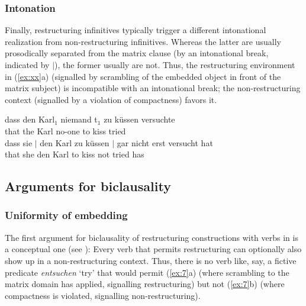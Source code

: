 \documentclass[output=paper]{langsci/langscibook}
\begin{document}
\subsubsection{\label{m7}Intonation}

Finally, restructuring infinitives typically trigger a different intonational
realization from non-restructuring infinitives. Whereas the latter are usually
prosodically separated from the matrix clause (by an intonational break,
indicated by $|$), the former usually are not. Thus, the restructuring
environment in (\ref{ex:xx}a) (signalled by scrambling of the embedded object
in front of the matrix subject) is incompatible with an intonational break; the
non-restructuring context (signalled by a violation of compactness) favors it.

\ea\label{ex:xx} 
    \ea \gll dass den Karl$_1$  niemand t$_1$ zu küssen versuchte\\
    that the Karl\textsubscript{\Acc} no-one\textsubscript{\Nom} {}  to kiss tried\\
    \ex \gll dass sie $|$ den Karl zu küssen $|$  gar nicht erst versucht hat\\
    that she\textsubscript{\Nom} {} den Karl\textsubscript{\Acc} to kiss {} \Ptcl{} not \Ptcl{} tried has\\
    \z
\z

\subsection{Arguments for biclausality}

\subsubsection{\label{b1}Uniformity of embedding}

The first argument for biclausality of restructuring constructions with 
verbs in  is a conceptual one (see
\citealt{Koster:87,Stechow&Sternefeld:88}): Every  verb that permits
restructuring can optionally also show up in a non-restructuring context. Thus,
there is no  verb like, say, a fictive predicate {\itshape entsuchen}
\enquote*{try} that would permit (\ref{ex:7}a) (where scrambling to the matrix
domain has applied, signalling restructuring) but not (\ref{ex:7}b) (where
compactness is violated, signalling non-restructuring).

\ea\label{ex:7} 
    \z
\z
\end{document}
